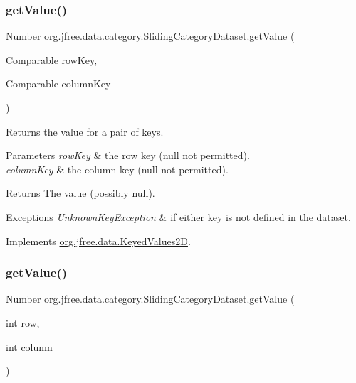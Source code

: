 \subsubsection{\texorpdfstring{get\+Value()}{getValue()}\hspace{0.1cm}{\footnotesize\ttfamily [1/2]}}
{\footnotesize\ttfamily Number org.\+jfree.\+data.\+category.\+Sliding\+Category\+Dataset.\+get\+Value (\begin{DoxyParamCaption}\item[{Comparable}]{row\+Key,  }\item[{Comparable}]{column\+Key }\end{DoxyParamCaption})}

Returns the value for a pair of keys.


\begin{DoxyParams}{Parameters}
{\em row\+Key} & the row key ({\ttfamily null} not permitted). \\
\hline
{\em column\+Key} & the column key ({\ttfamily null} not permitted).\\
\hline
\end{DoxyParams}
\begin{DoxyReturn}{Returns}
The value (possibly {\ttfamily null}).
\end{DoxyReturn}

\begin{DoxyExceptions}{Exceptions}
{\em \mbox{\hyperlink{classorg_1_1jfree_1_1data_1_1_unknown_key_exception}{Unknown\+Key\+Exception}}} & if either key is not defined in the dataset. \\
\hline
\end{DoxyExceptions}


Implements \mbox{\hyperlink{interfaceorg_1_1jfree_1_1data_1_1_keyed_values2_d_a61c450ca108cd99e53174fc91393a99a}{org.\+jfree.\+data.\+Keyed\+Values2D}}.

\mbox{\label{classorg_1_1jfree_1_1data_1_1category_1_1_sliding_category_dataset_a58d00a9725b902d17505e968469d9843}} 
\subsubsection{\texorpdfstring{get\+Value()}{getValue()}\hspace{0.1cm}{\footnotesize\ttfamily [2/2]}}
{\footnotesize\ttfamily Number org.\+jfree.\+data.\+category.\+Sliding\+Category\+Dataset.\+get\+Value (\begin{DoxyParamCaption}\item[{int}]{row,  }\item[{int}]{column }\end{DoxyParamCaption})}

